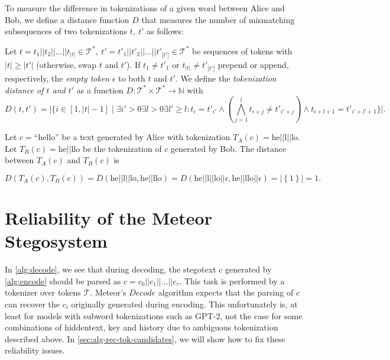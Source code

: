 To measure the difference in tokenizations of a given word between Alice and Bob, we define a distance function $D$ that measures the number of mismatching subsequences of two tokenizations $t,~ t'$ as follows:

\begin{definition}
Let $t = t_1 || t_2 || \dots || t_{|t|} \in \mathcal{T}^*,~ t' = t'_1 || t'_2 || \dots || t'_{|t'|} \in \mathcal{T}^*$ be sequences of tokens with $|t| \geq |t'|$ (otherwise, swap $t$ and $t'$).
If $t_1 \neq t'_1$ or $t_{|t|} \neq t'_{|t'|}$ prepend or append, respectively, the \emph{empty token} $\epsilon$ to both $t$ and $t'$.
We define the \emph{tokenization distance of $t$ and $t'$} as a function $D \colon \mathcal{T}^* \times \mathcal{T}^* \rightarrow \mathbb{N}$ with
$$D(t, t') = \big| \big\{ i \in [1, |t|-1] \mid \exists i' > 0 \exists l > 0 \exists l' \geq l: t_{i} = t'_{i'} \land \left( \bigwedge_{j=1}^{l} t_{i+j} \neq t'_{i'+j} \right) \land t_{i+l+1} = t'_{i'+l'+1} \big\} \big|.$$
\end{definition}

\begin{example}
Let $c = \textrm{``hello''}$ be a text generated by Alice with tokenization $T_A(c) = \textrm{he}||\textrm{l}||\textrm{lo}$.
Let $T_B(c) = \textrm{he}||\textrm{llo}$ be the tokenization of $c$ generated by Bob.
The distance between $T_A(c)$ and $T_B(c)$ is 

$$
D(T_A(c), T_B(c))
= D(\textrm{he}||\textrm{l}||\textrm{lo}, \textrm{he}||\textrm{llo})
= D(\textrm{he}||\textrm{l}||\textrm{lo}||\epsilon, \textrm{he}||\textrm{llo}||\epsilon)
= \left| \left\{ 1 \right\} \right| = 1.
$$
\end{example}

\section{Reliability of the Meteor Stegosystem}

In \autoref{alg:decode}, we see that during decoding, the stegotext $c$ generated by \autoref{alg:encode} should be parsed as $c = c_0 ||c_1 || \dots || c_{\tau}$.
This task is performed by a tokenizer over tokens $\mathcal{T}$.
Meteor's $Decode$ algorithm expects that the parsing of $c$ can recover the $c_i$ originally generated during encoding.
This unfortunately is, at least for models with subword tokenizations such as GPT-2, not the case for some combinations of hiddentext, key and history due to ambiguous tokenization described above.
In \autoref{sec:alg-rec-tok-candidates}, we will show how to fix these reliability issues.

